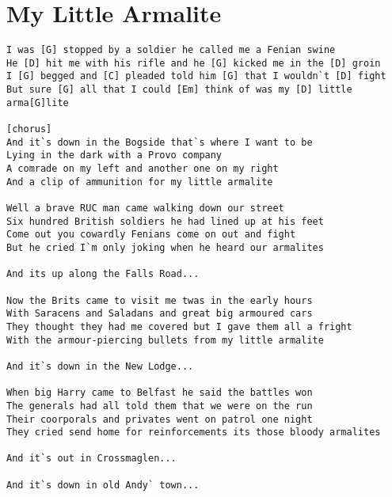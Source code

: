\documentclass[leqno]{memoir}
\begin{document}
\chapter{My Little Armalite}
\begin{verbatim}
I was [G] stopped by a soldier he called me a Fenian swine
He [D] hit me with his rifle and he [G] kicked me in the [D] groin
I [G] begged and [C] pleaded told him [G] that I wouldn`t [D] fight
But sure [G] all that I could [Em] think of was my [D] little arma[G]lite

[chorus]
And it`s down in the Bogside that`s where I want to be
Lying in the dark with a Provo company
A comrade on my left and another one on my right
And a clip of ammunition for my little armalite

Well a brave RUC man came walking down our street
Six hundred British soldiers he had lined up at his feet
Come out you cowardly Fenians come on out and fight
But he cried I`m only joking when he heard our armalites

And its up along the Falls Road...

Now the Brits came to visit me twas in the early hours
With Saracens and Saladans and great big armoured cars
They thought they had me covered but I gave them all a fright
With the armour-piercing bullets from my little armalite

And it`s down in the New Lodge...

When big Harry came to Belfast he said the battles won
The generals had all told them that we were on the run
Their coorporals and privates went on patrol one night
They cried send home for reinforcements its those bloody armalites

And it`s out in Crossmaglen...

And it`s down in old Andy` town...
\end{verbatim}
\newpage
\end{document}
